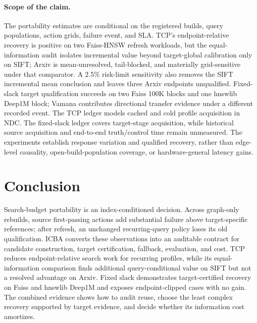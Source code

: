 \paragraph{Scope of the claim.}
The portability estimates are conditional on the registered builds, query populations, action grids, failure event, and SLA. TCP's endpoint-relative recovery is positive on two Faiss-HNSW refresh workloads, but the equal-information audit isolates incremental value beyond target-global calibration only on SIFT; Arxiv is mean-unresolved, tail-blocked, and materially grid-sensitive under that comparator. A 2.5\% risk-limit sensitivity also removes the SIFT incremental mean conclusion and leaves three Arxiv endpoints unqualified. Fixed-slack target qualification succeeds on two Faiss 100K blocks and one hnswlib Deep1M block; Vamana contributes directional transfer evidence under a different recorded event. The TCP ledger models cached and cold profile acquisition in NDC. The fixed-slack ledger covers target-stage acquisition, while historical source acquisition and end-to-end truth/control time remain unmeasured. The experiments establish response variation and qualified recovery, rather than edge-level causality, open-build-population coverage, or hardware-general latency gains.

\section{Conclusion}
Search-budget portability is an index-conditioned decision. Across graph-only rebuilds, source first-passing actions add substantial failure above target-specific references; after refresh, an unchanged recurring-query policy loses its old qualification. ICBA converts these observations into an auditable contract for candidate construction, target certification, fallback, evaluation, and cost. TCP reduces endpoint-relative search work for recurring profiles, while its equal-information comparison finds additional query-conditional value on SIFT but not a resolved advantage on Arxiv. Fixed slack demonstrates target-certified recovery on Faiss and hnswlib Deep1M and exposes endpoint-clipped cases with no gain. The combined evidence shows how to audit reuse, choose the least complex recovery supported by target evidence, and decide whether its information cost amortizes.
